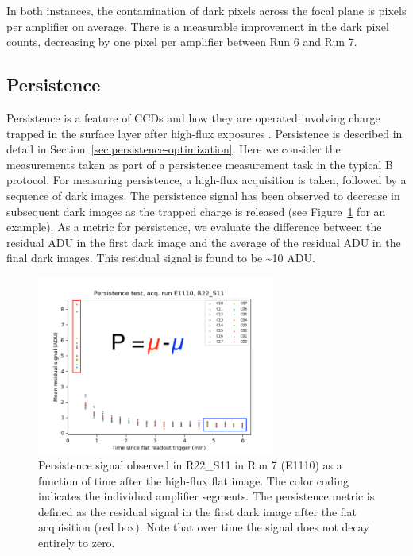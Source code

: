 In both instances, the contamination of dark pixels across the focal plane is  pixels per amplifier on average. There is a measurable improvement in the dark pixel counts, decreasing by one pixel per amplifier between Run 6 and Run 7.

\subsection{Persistence}\label{initPersistenceChar}

Persistence is a feature of CCDs and how they are operated involving charge trapped in the
surface layer after high-flux exposures \citep{dmtn-276,2024SPIE13103E..0WU}.
Persistence is described in detail in Section~\ref{sec:persistence-optimization}.
Here we consider the measurements taken as
part of a persistence measurement task in the typical B protocol. For
measuring persistence, a high-flux acquisition is taken, followed by a
sequence of dark images. The persistence signal has been observed to
decrease in subsequent dark images as the trapped charge is released (see Figure~\ref{fig:persistence-decay} for an example). As a metric for persistence,
we evaluate the difference between the residual ADU in the first dark
image and the average of the residual ADU in the final dark images. This residual signal is found to be \textasciitilde10 ADU.

\begin{figure}[ht]
\begin{centering}
\includegraphics[width=0.7\textwidth]{figures/baselineCharacterization/persistence_plot_LSSTCam_R22_S11_u_lsstccs_eo_persistence_E1110_w_2024_35_20240926T235141Z.png}
\caption{Persistence signal observed in R22\_S11 in Run 7 (E1110) as a function of time after the high-flux flat image.  The color coding indicates the individual amplifier segments.  The persistence metric is defined as the residual signal in the first dark image after the flat acquisition (red box).  Note that over time the signal does not decay entirely to zero.}
\label{fig:persistence-decay}
\end{centering}
\end{figure}

